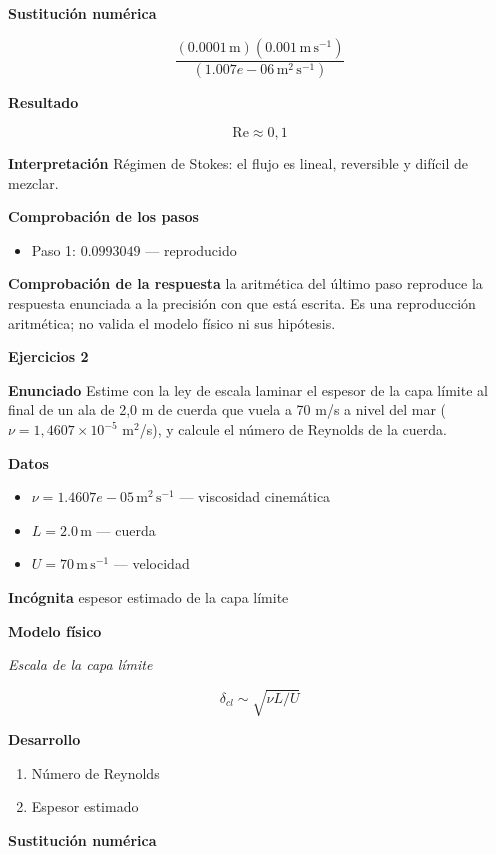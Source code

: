 \documentclass[10pt,openany]{book}
\begin{document}
\noindent\textbf{Sustitución numérica}

\[
\frac{\left(0.0001\,\mathrm{m}\right) \left(0.001\,\mathrm{m}\,\mathrm{s}^{-1}\right)}{\left(1.007e-06\,\mathrm{m}^{2}\,\mathrm{s}^{-1}\right)}
\]

\noindent\textbf{Resultado}

\[
\mathrm{Re} \approx 0{,}1
\]

\noindent\textbf{Interpretación}
Régimen de Stokes: el flujo es lineal, reversible y difícil de mezclar.

\noindent\textbf{Comprobación de los pasos}
\begin{itemize}
\item Paso 1: $0.0993049$ — reproducido
\end{itemize}

\noindent\textbf{Comprobación de la respuesta} la aritmética del último paso reproduce la respuesta enunciada a la precisión con que está escrita. Es una reproducción aritmética; no valida el modelo físico ni sus hipótesis.

\noindent\textbf{Ejercicios 2}

\noindent\textbf{Enunciado}
Estime con la ley de escala laminar el espesor de la capa límite al final de un ala de 2,0 m de cuerda que vuela a 70 m/s a nivel del mar (\(\nu = 1{,}4607\times 10^{-5}\) m\(^2\)/s), y calcule el número de Reynolds de la cuerda.

\noindent\textbf{Datos}
\begin{itemize}
\item $\nu = 1.4607e-05\,\mathrm{m}^{2}\,\mathrm{s}^{-1}$ — viscosidad cinemática
\item $L = 2.0\,\mathrm{m}$ — cuerda
\item $U = 70\,\mathrm{m}\,\mathrm{s}^{-1}$ — velocidad
\end{itemize}

\noindent\textbf{Incógnita}
espesor estimado de la capa límite

\noindent\textbf{Modelo físico}

\noindent\textit{Escala de la capa límite}

\[
\delta_{cl} \sim \sqrt{\nu L/U}
\]

\noindent\textbf{Desarrollo}
\begin{enumerate}
\item
Número de Reynolds
\item
Espesor estimado
\end{enumerate}

\noindent\textbf{Sustitución numérica}
\end{document}
